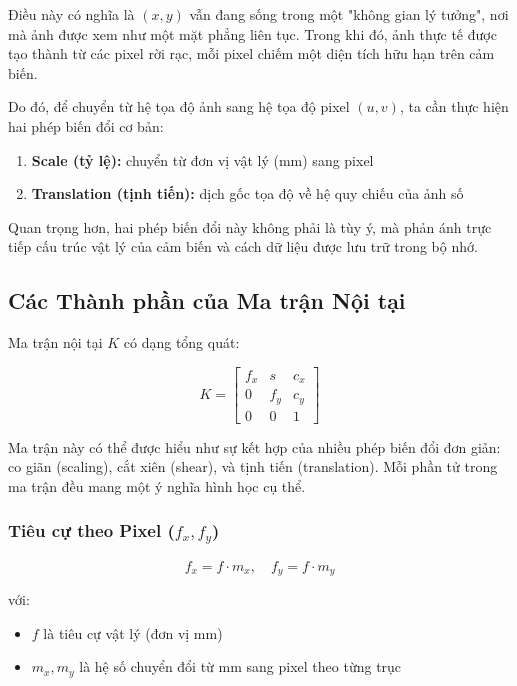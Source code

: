 Điều này có nghĩa là $(x, y)$ vẫn đang sống trong một "không gian lý tưởng", nơi mà ảnh được xem như một mặt phẳng liên tục. Trong khi đó, ảnh thực tế được tạo thành từ các pixel rời rạc, mỗi pixel chiếm một diện tích hữu hạn trên cảm biến.

Do đó, để chuyển từ hệ tọa độ ảnh sang hệ tọa độ pixel $(u, v)$, ta cần thực hiện hai phép biến đổi cơ bản:

\begin{enumerate}
	\item \textbf{Scale (tỷ lệ):} chuyển từ đơn vị vật lý (mm) sang pixel
	\item \textbf{Translation (tịnh tiến):} dịch gốc tọa độ về hệ quy chiếu của ảnh số
\end{enumerate}

Quan trọng hơn, hai phép biến đổi này không phải là tùy ý, mà phản ánh trực tiếp cấu trúc vật lý của cảm biến và cách dữ liệu được lưu trữ trong bộ nhớ.

\subsection{Các Thành phần của Ma trận Nội tại}
\label{subsec:intrinsic_components}

Ma trận nội tại $K$ có dạng tổng quát:

\[
K =
\begin{bmatrix}
	f_x & s & c_x \\
	0   & f_y & c_y \\
	0   & 0   & 1
\end{bmatrix}
\]

Ma trận này có thể được hiểu như sự kết hợp của nhiều phép biến đổi đơn giản: co giãn (scaling), cắt xiên (shear), và tịnh tiến (translation). Mỗi phần tử trong ma trận đều mang một ý nghĩa hình học cụ thể.

\subsubsection{Tiêu cự theo Pixel ($f_x, f_y$)}

\[
f_x = f \cdot m_x, \quad f_y = f \cdot m_y
\]

với:
\begin{itemize}
	\item $f$ là tiêu cự vật lý (đơn vị mm)
	\item $m_x, m_y$ là hệ số chuyển đổi từ mm sang pixel theo từng trục
\end{itemize}

